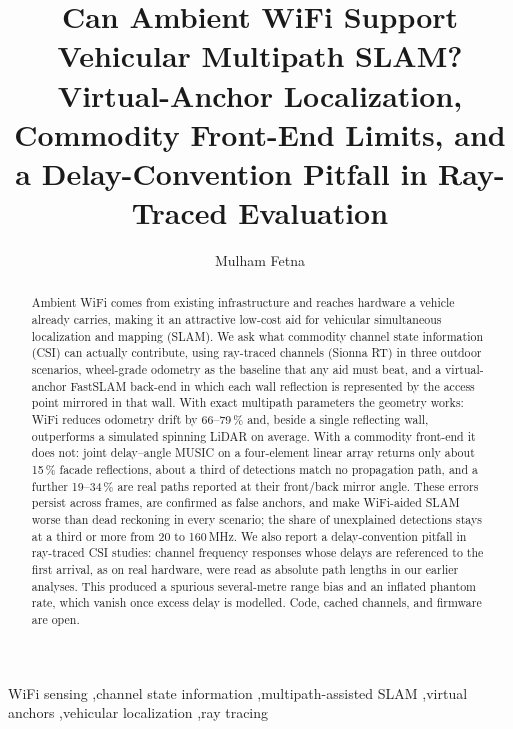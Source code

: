 \documentclass[preprint,12pt]{elsarticle}
\begin{document}
\begin{frontmatter}

\title{Can Ambient WiFi Support Vehicular Multipath SLAM? Virtual-Anchor Localization,
Commodity Front-End Limits, and a Delay-Convention Pitfall in Ray-Traced Evaluation}

\author{Mulham Fetna}

\begin{abstract}
Ambient WiFi comes from existing infrastructure and reaches hardware a vehicle already
carries, making it an attractive low-cost aid for vehicular simultaneous localization and
mapping (SLAM). We ask what commodity channel state information (CSI) can actually contribute,
using ray-traced channels (Sionna RT) in three outdoor scenarios, wheel-grade odometry as the
baseline that any aid must beat, and a virtual-anchor FastSLAM back-end in which each wall
reflection is represented by the access point mirrored in that wall. With exact multipath
parameters the geometry works: WiFi reduces odometry drift by 66--79\,\% and, beside a single
reflecting wall, outperforms a simulated spinning LiDAR on average. With a commodity front-end it does not:
joint delay--angle MUSIC on a four-element linear array returns only about 15\,\% facade
reflections, about a third of detections match no propagation path, and a further 19--34\,\% are
real paths reported at their front/back mirror angle. These errors persist across frames, are
confirmed as false anchors, and make WiFi-aided SLAM worse than dead reckoning in every scenario;
the share of unexplained detections stays at a third or more from 20 to 160\,MHz. We also
report a delay-convention pitfall in ray-traced CSI studies: channel frequency responses whose
delays are referenced to the first arrival, as on real hardware, were read as absolute path
lengths in our earlier analyses. This produced a spurious several-metre range bias and an
inflated phantom rate, which vanish once excess delay is modelled. Code, cached channels, and
firmware are open.
\end{abstract}

\begin{keyword}
WiFi sensing \sep channel state information \sep multipath-assisted SLAM \sep virtual anchors
\sep vehicular localization \sep ray tracing
\end{keyword}

\end{frontmatter}
\end{document}
